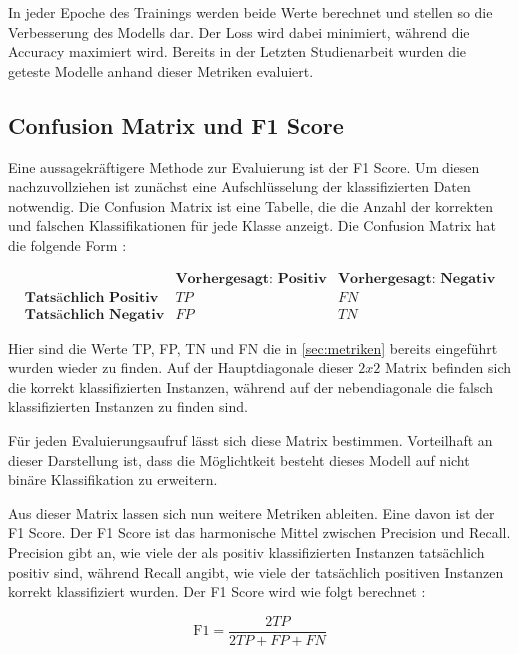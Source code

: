 In jeder Epoche des Trainings werden beide Werte berechnet und stellen so die Verbesserung des Modells dar. Der Loss wird dabei minimiert, während die Accuracy maximiert wird. Bereits in der Letzten Studienarbeit wurden die geteste Modelle anhand dieser Metriken evaluiert.

\subsection{Confusion Matrix und F1 Score} \label{sec:confusionmatrix}

Eine aussagekräftigere Methode zur Evaluierung ist der F1 Score. Um diesen nachzuvollziehen ist zunächst eine Aufschlüsselung der klassifizierten Daten notwendig. Die Confusion Matrix ist eine Tabelle, die die Anzahl der korrekten und falschen Klassifikationen für jede Klasse anzeigt. Die Confusion Matrix hat die folgende Form \cite{lipton_thresholding_2014}:

\[
\begin{array}{c|cc}
    & \textbf{Vorhergesagt: Positiv} & \textbf{Vorhergesagt: Negativ} \\
    \hline
    \textbf{Tatsächlich Positiv} & TP & FN \\
    \textbf{Tatsächlich Negativ} & FP & TN
\end{array}
\]

Hier sind die Werte TP, FP, TN und FN die in \autoref{sec:metriken} bereits eingeführt wurden wieder zu finden. Auf der Hauptdiagonale dieser $2x2$ Matrix befinden sich die korrekt klassifizierten Instanzen, während auf der nebendiagonale die falsch klassifizierten Instanzen zu finden sind. 

Für jeden Evaluierungsaufruf lässt sich diese Matrix bestimmen. Vorteilhaft an dieser Darstellung ist, dass die Möglichtkeit besteht dieses Modell auf nicht binäre Klassifikation zu erweitern. 

Aus dieser Matrix lassen sich nun weitere Metriken ableiten. Eine davon ist der F1 Score. Der F1 Score ist das harmonische Mittel zwischen Precision und Recall. Precision gibt an, wie viele der als positiv klassifizierten Instanzen tatsächlich positiv sind, während Recall angibt, wie viele der tatsächlich positiven Instanzen korrekt klassifiziert wurden. Der F1 Score wird wie folgt berechnet \cite{lipton_thresholding_2014}:

\begin{equation}
    \text{F1} = \frac{2 TP}{2 TP + FP + FN }
\end{equation}

